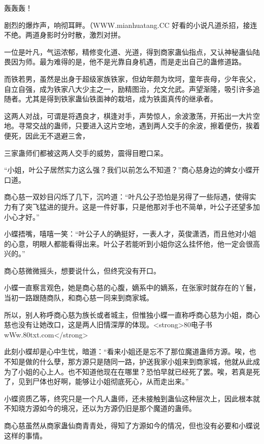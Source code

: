 
\begin{this_body}

轰轰轰！

剧烈的爆炸声，响彻耳畔。（WWW.mianhuatang.CC 好看的小说凡道杀招，接连不绝。两道身影时分时散，激烈对拼。

一位是叶凡，气运浓郁，精修变化道、光道，得到商家蛊仙指点，又认神秘蛊仙陆畏因为师。最为难得的是，他不是光靠自身机遇，而是走出自己的蛊修道路。

而铁若男，虽然是出身于超级家族铁家，但幼年颇为坎坷，童年丧母，少年丧父，自立自强，成为铁家八大少主之一，励精图治，允文允武。声望渐隆，吸引许多追随者。尤其是得到铁家蛊仙铁面神的栽培，成为铁面真传的继承者。

这两人对战，可谓是将遇良才，棋逢对手，声势惊人，余波激荡，开拓出一大片空地。寻常交战的蛊师，只要进入这片空地，遇到两人交手的余波，擦着便伤，挨着便死，因此无不退避三舍，

三家蛊师们都被这两人交手的威势，震得目瞪口呆。

“小姐，叶公子居然实力这么强？我们以前怎么不知道？”商心慈身边的婢女小蝶开口道。

商心慈一双妙目闪烁了几下，沉吟道：“叶凡公子恐怕是另得了一些际遇，使得实力有了突飞猛进的提升。这是一件好事，只是他那对手也不简单，叶公子还望多加小心才好。”

小蝶捂嘴，嘻嘻一笑：“叶公子人的确挺好，一表人才，英俊潇洒，而且他对小姐的心意，明眼人都能看得出来。叶公子若能听到小姐你这么挂怀他，他一定会很高兴的。”

商心慈微微摇头，想要说什么，但终究没有开口。

小蝶一直察言观色，她是商心慈的心腹，嫡系中的嫡系，在张家时就存在的丫鬟，当初一路跟随商队，和商心慈一同来到商家城。

所以，别人称呼商心慈为族长或者城主，但惟独小蝶一直称呼商心慈为小姐，商心慈也没有让她改口，这是两人旧情深厚的体现。<strong>80电子书wWw.80txt.com</strong>

此刻小蝶却是心中生忧，暗道：“看来小姐还是忘不了那位魔道蛊师方源。唉，也不知是做的什么孽，那方源只是随同一路，护送我家小姐来到商家城，他就从此成为了小姐的心上人。也不知道他现在在哪里？恐怕早就已经死了罢。唉，若真是死了，见到尸体也好啊，能够让小姐彻底死心，从而走出来。”

小蝶资质乙等，终究只是一个凡人蛊师，还未接触到蛊仙这种层次上，因此根本就不知晓方源如今的境况，还以为方源仍旧是那个魔道的蛊师。

商心慈虽然从商家蛊仙商青青处，得知了方源如今的情况，但也没有必要和小蝶说这样的事情。


\end{this_body}
